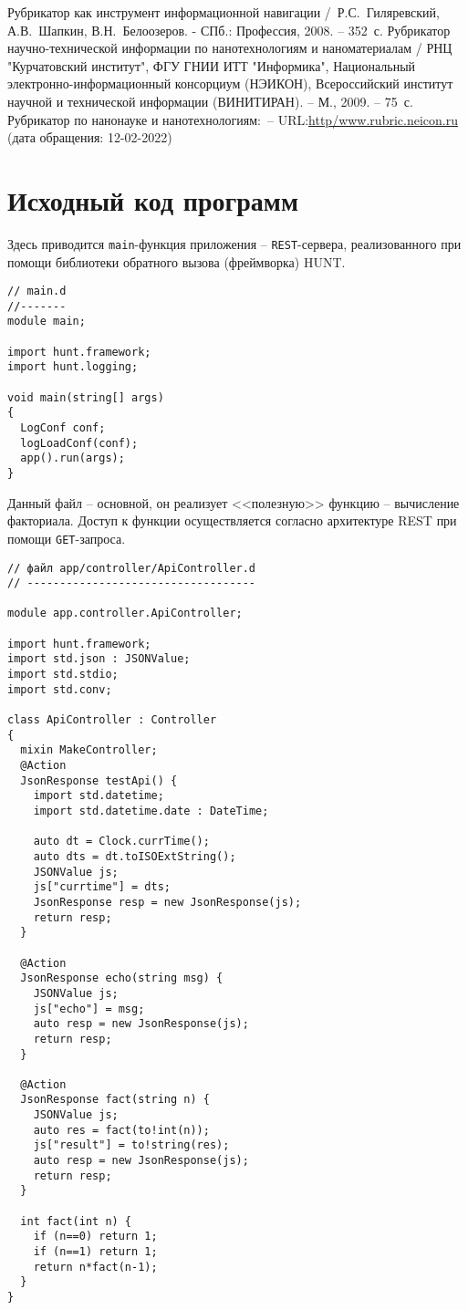 \documentclass{studrep}
\begin{document}
\begin{thebibliography}{99}
  Рубрикатор как инструмент информационной навигации /~Р.С.~Гиляревский, А.В.~Шапкин, В.Н.~Белоозеров. - СПб.\;: Профессия, 2008. -- 352~с.
  Рубрикатор научно-технической информации по нанотехнологиям и наноматериалам / РНЦ "Курчатовский институт",
ФГУ ГНИИ ИТТ "Информика", Национальный электронно-информационный консорциум (НЭИКОН), Всероссийский институт научной и технической информации (ВИНИТИРАН). -- М., 2009. -- 75~с.
  Рубрикатор по нанонауке и нанотехнологиям\;:\;[сайт]~-- URL:\url{http/www.rubric.neicon.ru} (дата обращения: 12-02-2022)
\end{thebibliography}

\appendices

\appendix
\chapter{Исходный код программ}

Здесь приводится \texttt{main}-функция приложения -- \texttt{REST}-сервера, реализованного при помощи библиотеки обратного вызова (фреймворка) HUNT.
\begin{verbatim}
// main.d
//-------
module main;

import hunt.framework;
import hunt.logging;

void main(string[] args)
{
  LogConf conf;
  logLoadConf(conf);
  app().run(args);
}
\end{verbatim}

Данный файл -- основной, он реализует <<полезную>> функцию -- вычисление факториала.  Доступ к функции осуществляется согласно архитектуре REST при помощи \texttt{GET}-запроса.

\begin{verbatim}
// файл app/controller/ApiController.d
// -----------------------------------

module app.controller.ApiController;

import hunt.framework;
import std.json : JSONValue;
import std.stdio;
import std.conv;

class ApiController : Controller
{
  mixin MakeController;
  @Action
  JsonResponse testApi() {
    import std.datetime;
    import std.datetime.date : DateTime;

    auto dt = Clock.currTime();
    auto dts = dt.toISOExtString();
    JSONValue js;
    js["currtime"] = dts;
    JsonResponse resp = new JsonResponse(js);
    return resp;
  }

  @Action
  JsonResponse echo(string msg) {
    JSONValue js;
    js["echo"] = msg;
    auto resp = new JsonResponse(js);
    return resp;
  }

  @Action
  JsonResponse fact(string n) {
    JSONValue js;
    auto res = fact(to!int(n));
    js["result"] = to!string(res);
    auto resp = new JsonResponse(js);
    return resp;
  }

  int fact(int n) {
    if (n==0) return 1;
    if (n==1) return 1;
    return n*fact(n-1);
  }
}
\end{verbatim}
\end{document}
